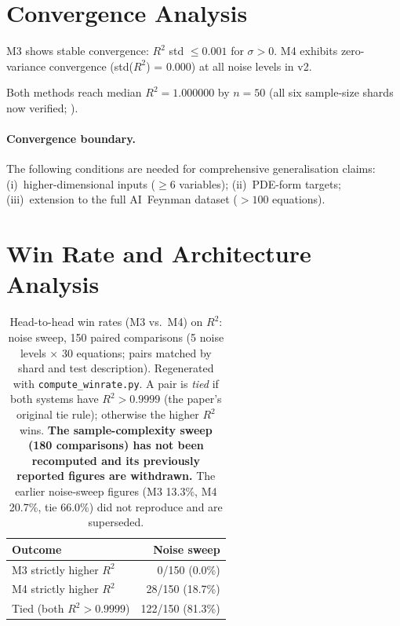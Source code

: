 \documentclass[twoside,11pt]{article}
\newcommand{\Rsq}{R^{2}}
\begin{document}
\section{Convergence Analysis}
\label{sec:convergence}

M3 shows stable convergence: $\Rsq$ std $\leq 0.001$ for $\sigma>0$.
M4 exhibits zero-variance convergence (std($\Rsq$) = 0.000) at all noise
levels in v2.

Both methods reach median $\Rsq=1.000000$ by $n=50$ (all six sample-size
shards now verified; ).

\paragraph{Convergence boundary.}
The following conditions are needed for comprehensive generalisation claims:
(i)~higher-dimensional inputs ($\geq 6$ variables);
(ii)~PDE-form targets;
(iii)~extension to the full AI~Feynman dataset ($>100$ equations).

\section{Win Rate and Architecture Analysis}
\label{sec:winrate}

\begin{table}[H]
\centering
\caption{Head-to-head win rates (M3 vs.\ M4) on $\Rsq$: noise sweep, 150 paired
comparisons (5 noise levels $\times$ 30 equations; pairs matched by shard and
test description). Regenerated with \texttt{compute\_winrate.py}. A pair is
\emph{tied} if both systems have $\Rsq>0.9999$ (the paper's original tie rule);
otherwise the higher $\Rsq$ wins. \textbf{The sample-complexity sweep
(180 comparisons) has not been recomputed and its previously reported figures
are withdrawn.} The earlier noise-sweep figures (M3 13.3\%, M4 20.7\%, tie
66.0\%) did not reproduce and are superseded.}
\label{tab:winrate}
\small
\begin{tabular}{l r}
\toprule
\textbf{Outcome} & \textbf{Noise sweep}\\
\midrule
M3 strictly higher $\Rsq$ & 0/150 (0.0\%)\\
M4 strictly higher $\Rsq$ & 28/150 (18.7\%)\\
Tied (both $\Rsq>0.9999$)  & 122/150 (81.3\%)\\
\bottomrule
\end{tabular}
\end{table}
\end{document}
